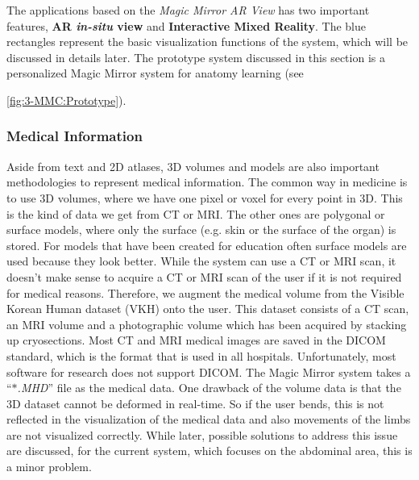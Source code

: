 The applications based on the \textit{Magic Mirror AR View} has two important features, \textbf{AR \textit{in-situ} view} and \textbf{Interactive Mixed Reality}. The blue rectangles represent the basic visualization functions of the system, which will be discussed in details later. The prototype system discussed in this section is a personalized Magic Mirror system for anatomy learning (see \figurename{\ref{fig:3-MMC:Prototype}). 

\subsubsection{Medical Information}
Aside from text and 2D atlases, 3D volumes and models are also important methodologies to represent medical information. The common way in medicine is to use 3D volumes, where we have one pixel or voxel for every point in 3D. This is the kind of data we get from CT or MRI. The other ones are polygonal or surface models, where only the surface (e.g. skin or the surface of the organ) is stored. For models that have been created for education often surface models are used because they look better.
While the system can use a CT or MRI scan, it doesn't make sense to acquire a CT or MRI scan of the user if it is not required for medical reasons. Therefore, we augment the medical volume from the Visible Korean Human dataset (VKH) \cite{Park2006} onto the user. This dataset consists of a CT scan, an MRI volume and a photographic volume which has been acquired by stacking up cryosections. 
Most CT and MRI medical images are saved in the DICOM standard, which is the format that is used in all hospitals. Unfortunately, most software for research does not support DICOM. The Magic Mirror system takes a ``\textit{$\ast$.MHD}'' file as the medical data. One drawback of the volume data is that the 3D dataset cannot be deformed in real-time. So if the user bends, this is not reflected in the visualization of the medical data and also movements of the limbs are not visualized correctly. While later, possible solutions to address this issue are discussed, for the current system, which focuses on the abdominal area, this is a minor problem.

}
